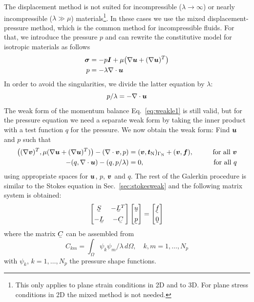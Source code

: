 The displacement method is not suited for incompressible ($\lambda\rightarrow\infty$) or nearly incompressible ($\lambda\gg\mu$) materials\footnote{This only applies to plane strain conditions in 2D and to 3D. For plane stress conditions in 2D the mixed method is not needed.}. In these cases we use the mixed displacement-pressure method, which is the common method for incompressible fluids.
For that, we introduce the pressure $p$ and can rewrite the constitutive model for isotropic materials as follows
\begin{align}
  \boldsymbol{\sigma} &= -p\boldsymbol{I}+\mu\big(\nabla\boldsymbol{u}+(\nabla\boldsymbol{u})^T\big)\\
  p&=-\lambda\nabla\cdot\boldsymbol{u}
\end{align}
In order to avoid the singularities, we divide the latter equation by $\lambda$:
\begin{equation}
   p/\lambda=-\nabla\cdot\boldsymbol{u}
\end{equation}
The weak form of the momentum balance Eq.~\eqref{eq:weakle1} is still valid, but for the pressure equation we need a separate weak form by taking the inner product with a test function $q$ for the pressure. We now obtain the weak form: Find $\boldsymbol{u}$ and $p$ such that
\begin{alignat}{2}
 \big((\nabla\boldsymbol{v})^T,\mu(\nabla\boldsymbol{u}+(\nabla\boldsymbol{u})^T)\big)-(\nabla\cdot\boldsymbol{v},p)&=(\boldsymbol{v},\boldsymbol{t}_{\text{N}})_{\Gamma_{\text{N}}}+(\boldsymbol{v},\boldsymbol{f}),\qquad&\text{for all }\boldsymbol{v}\label{eq:weakle3}\\
    -(q,\nabla\cdot\boldsymbol{u})-(q,p/\lambda) &=0,\qquad&\text{for all }q\label{eq:weakle4}
\end{alignat}
using appropriate spaces for $\boldsymbol{u}$, $p$, $\boldsymbol{v}$ and $q$. The rest of the Galerkin procedure is similar to the Stokes equation in Sec.~\ref{sec:stokesweak} and the following matrix system is obtained:
\[
 \begin{bmatrix}
   \mat{S} &-\mat{L}^T \\[1ex]
   -\mat{L} &-\mat C
 \end{bmatrix}
 \begin{bmatrix}
    \col{u}\\[1ex]
    \col p
 \end{bmatrix}=
 \begin{bmatrix}
    \col{f}\\[1ex]
    \col 0
 \end{bmatrix}
\]
where the matrix $\mat C$ can be assembled from
\[
C_{km} = \int_\Omega \psi_k\psi_m/\lambda \,d\Omega,\quad k,m=1,\ldots,N_p
\]
with $\psi_k$, $k=1,\ldots,N_p$ the pressure shape functions.

